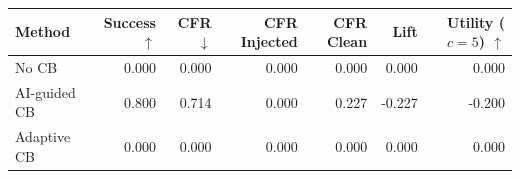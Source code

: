 \begin{tabular}{lrrrrrr}
\toprule
Method & Success $\uparrow$ & CFR $\downarrow$ & CFR Injected & CFR Clean & Lift & Utility ($c=5$) $\uparrow$ \\
\midrule
No CB & 0.000 & 0.000 & 0.000 & 0.000 & 0.000 & 0.000 \\
AI-guided CB & 0.800 & 0.714 & 0.000 & 0.227 & -0.227 & -0.200 \\
Adaptive CB & 0.000 & 0.000 & 0.000 & 0.000 & 0.000 & 0.000 \\
\bottomrule
\end{tabular}
